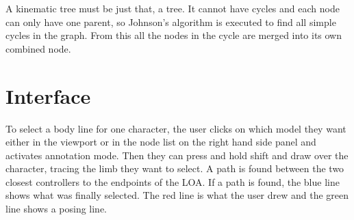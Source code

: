 A kinematic tree must be just that, a tree. It cannot have cycles and each node can only have one parent, so Johnson's algorithm is executed to find all simple cycles in the graph. From this all the nodes in the cycle are merged into its own combined node.

\section{Interface}
To select a body line for one character, the user clicks on which model they want either in the viewport or in the node list on the right hand side panel and activates annotation mode. Then they can press and hold shift and draw over the character, tracing the limb they want to select. A path is found between the two closest controllers to the endpoints of the LOA. If a path is found, the blue line shows what was finally selected. The red line is what the user drew and the green line shows a posing line.

